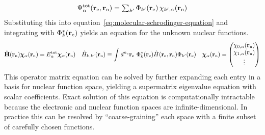 \documentclass[11pt]{article}
\begin{document}
\begin{rmk}
\begin{align}
\label{eq:general-wavefunction-expansion}
  \Psi _{\alpha }^{\mathrm{tot}}(\mathbf{r}_{\mathrm{e}}, \mathbf{r}_{\mathrm{n}})
=
{\textstyle
  \sum_{k'}
  \Phi _{k'}(\mathbf{r}_{\mathrm{e}})\,
  \chi _{k',\alpha }(\mathbf{r}_{\mathrm{n}})
}
\end{align}
Substituting this into equation~\ref{eq:molecular-schrodinger-equation} and integrating with $\Phi _k^*(\mathbf{r}_{\mathrm{e}})$ yields an equation for the unknown nuclear functions.
\begin{align}
\label{eq:general-nuclear-schrodinger-equation}
  \op{\bo{H}}(\bo{r}_\mr{n})
  \bm{\x}_\a(\bo{r}_\mr{n})
=
  E_\a^\mr{tot}
  \bm{\x}_\a(\bo{r}_\mr{n})
&&
  \op{H}_{k,k'}(\bo{r}_\mr{n})
\equiv
  \int
  d^{n_\mr{e}}\bo{r}_\mr{e}\,\,
  \F_k^*(\bo{r}_\mr{e})
  \op{H}(\bo{r}_\mr{e},\bo{r}_\mr{n})
  \F_{k'}(\bo{r}_\mr{e})
&&
  \bm{\x}_\a(\bo{r}_\mr{n})
=
\ma{
  \x_{0,\a}(\bo{r}_\mr{n})\\
  \x_{1,\a}(\bo{r}_\mr{n})\\
  \vdots
}
\end{align}
This operator matrix equation can be solved by further expanding each entry in a basis for nuclear function space, yielding a supermatrix eigenvalue equation with scalar coefficients.
Exact solution of this equation is computationally intractable because the electronic and nuclear function spaces are infinite-dimensional.
In practice this can be resolved by ``coarse-graining'' each space with a finite subset of carefully chosen functions.
\end{rmk}
\end{document}
